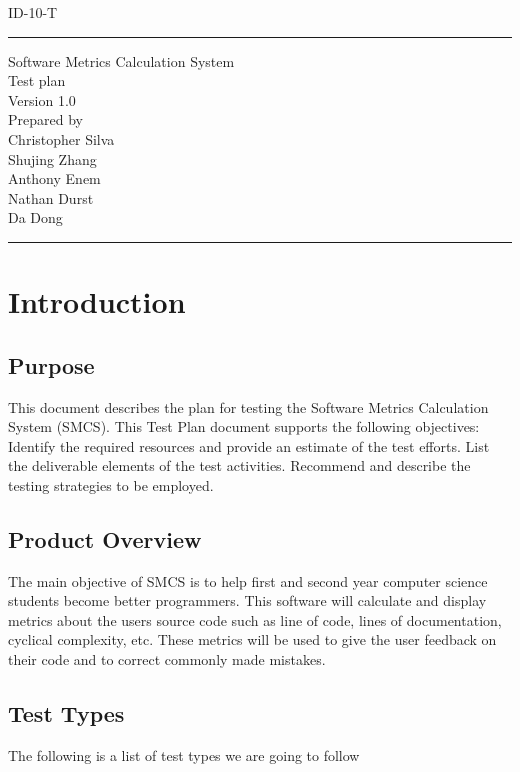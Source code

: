 \documentclass{scrreprt}
\author{Christopher Silva}
\date{}
\def\myversion{1.0 }
\begin{document}
	\begin{titlepage}
		\flushright
		\LARGE{ID-10-T}
		\rule{16cm}{5pt}\vskip1cm
		\centering
		\Huge{Software Metrics Calculation System}\\
		\vspace{2cm}
		\Huge{Test plan}\\
		\vspace{2cm}
		\LARGE{Version \myversion\\}
		\vspace{2cm}
		Prepared by\\
	    Christopher Silva\\
	    Shujing Zhang\\
		Anthony Enem\\
		Nathan Durst\\
		Da Dong\\
		\vfill
		\rule{16cm}{5pt}
	\end{titlepage}
	\tableofcontents
	{\let\clearpage\relax \chapter{Introduction}}
	
	\section{Purpose}
	This document describes the plan for testing the Software Metrics Calculation System (SMCS). This Test Plan document supports the following objectives:
	Identify the required resources and provide an estimate of the test efforts.
	List the deliverable elements of the test activities.
	Recommend and describe the testing strategies to be employed.

	\section{Product Overview}
	The main objective of SMCS is to help first and second year computer science students become better programmers.
	This software will calculate and display metrics about the users source code such as line of code, lines of documentation, cyclical complexity, etc.
	These metrics will be used to give the user feedback on their code and to correct commonly made mistakes.
	
	\section{Test Types}
	The following is a list of test types we are going to follow
\end{document}
